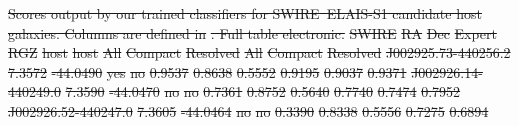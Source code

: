 \documentclass[11pt, a4paper]{book}
\providecommand{\DIFdeltex}[1]{{\protect\color{red}\sout{#1}}}                      %
\providecommand{\DIFdel}[1]{\texorpdfstring{\DIFdeltex{#1}}{}} %
\begin{document}
{%
\DIFdel{Scores output by our trained classifiers for SWIRE~ELAIS-S1 candidate host galaxies. Columns are defined in }%
\DIFdel{. Full table electronic.}}
\DIFdel{SWIRE }%
\DIFdel{RA }%
\DIFdel{Dec }%
\DIFdel{Expert }%
\DIFdel{RGZ }%
\DIFdel{host }%
\DIFdel{host }%
\DIFdel{All }%
\DIFdel{Compact }%
\DIFdel{Resolved }%
\DIFdel{All }%
\DIFdel{Compact }%
\DIFdel{Resolved }%
\DIFdel{J002925.73-440256.2 }%
\DIFdel{7.3572 }%
\DIFdel{-44.0490 }%
\DIFdel{yes }%
\DIFdel{no }%
\DIFdel{0.9537 }%
\DIFdel{0.8638 }%
\DIFdel{0.5552 }%
\DIFdel{0.9195 }%
\DIFdel{0.9037 }%
\DIFdel{0.9371}%
\DIFdel{J002926.14-440249.0 }%
\DIFdel{7.3590 }%
\DIFdel{-44.0470 }%
\DIFdel{no }%
\DIFdel{no }%
\DIFdel{0.7361 }%
\DIFdel{0.8752 }%
\DIFdel{0.5640 }%
\DIFdel{0.7740 }%
\DIFdel{0.7474 }%
\DIFdel{0.7952}%
\DIFdel{J002926.52-440247.0 }%
\DIFdel{7.3605 }%
\DIFdel{-44.0464 }%
\DIFdel{no }%
\DIFdel{no }%
\DIFdel{0.3390 }%
\DIFdel{0.8338 }%
\DIFdel{0.5556 }%
\DIFdel{0.7275 }%
\DIFdel{0.6894 }%
\end{document}
